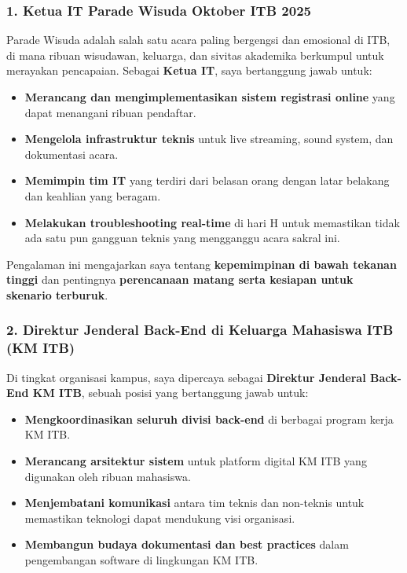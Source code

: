 \documentclass[
  letterpaper,
  DIV=11,
  numbers=noendperiod]{scrreprt}
\providecommand{\tightlist}{%
  \setlength{\itemsep}{0pt}\setlength{\parskip}{0pt}}
\begin{document}
\subsubsection{\texorpdfstring{\textbf{1. Ketua IT Parade Wisuda Oktober
ITB
2025}}{1. Ketua IT Parade Wisuda Oktober ITB 2025}}\label{ketua-it-parade-wisuda-oktober-itb-2025}

Parade Wisuda adalah salah satu acara paling bergengsi dan emosional di
ITB, di mana ribuan wisudawan, keluarga, dan sivitas akademika berkumpul
untuk merayakan pencapaian. Sebagai \textbf{Ketua IT}, saya bertanggung
jawab untuk:

\begin{itemize}
\tightlist
\item
  \textbf{Merancang dan mengimplementasikan sistem registrasi online}
  yang dapat menangani ribuan pendaftar.
\item
  \textbf{Mengelola infrastruktur teknis} untuk live streaming, sound
  system, dan dokumentasi acara.
\item
  \textbf{Memimpin tim IT} yang terdiri dari belasan orang dengan latar
  belakang dan keahlian yang beragam.
\item
  \textbf{Melakukan troubleshooting real-time} di hari H untuk
  memastikan tidak ada satu pun gangguan teknis yang mengganggu acara
  sakral ini.
\end{itemize}

Pengalaman ini mengajarkan saya tentang \textbf{kepemimpinan di bawah
tekanan tinggi} dan pentingnya \textbf{perencanaan matang serta kesiapan
untuk skenario terburuk}.

\subsubsection{\texorpdfstring{\textbf{2. Direktur Jenderal Back-End di
Keluarga Mahasiswa ITB (KM
ITB)}}{2. Direktur Jenderal Back-End di Keluarga Mahasiswa ITB (KM ITB)}}\label{direktur-jenderal-back-end-di-keluarga-mahasiswa-itb-km-itb}

Di tingkat organisasi kampus, saya dipercaya sebagai \textbf{Direktur
Jenderal Back-End KM ITB}, sebuah posisi yang bertanggung jawab untuk:

\begin{itemize}
\tightlist
\item
  \textbf{Mengkoordinasikan seluruh divisi back-end} di berbagai program
  kerja KM ITB.
\item
  \textbf{Merancang arsitektur sistem} untuk platform digital KM ITB
  yang digunakan oleh ribuan mahasiswa.
\item
  \textbf{Menjembatani komunikasi} antara tim teknis dan non-teknis
  untuk memastikan teknologi dapat mendukung visi organisasi.
\item
  \textbf{Membangun budaya dokumentasi dan best practices} dalam
  pengembangan software di lingkungan KM ITB.
\end{itemize}
\end{document}
